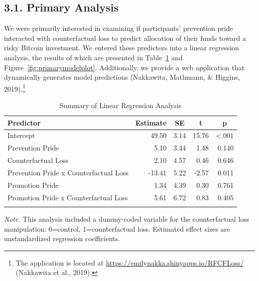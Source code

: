 \documentclass[man,floatsintext]{apa6}
\let\rmarkdownfootnote\footnote%
\def\footnote{\protect\rmarkdownfootnote}
\begin{document}
\hypertarget{primary-analysis}{%
\subsection{3.1. Primary Analysis}\label{primary-analysis}}

We were primarily interested in examining if participants' prevention pride interacted with counterfactual loss to predict allocation of their funds toward a risky Bitcoin investment. We entered these predictors into a linear regression analysis, the results of which are presented in Table~\ref{tab:primarymodelprint} and Figure~\ref{fig:primarymodelplot}. Additionally, we provide a web application that dynamically generates model predictions (Nakkawita, Mathmann, \& Higgins, 2019).\footnote{The application is located at \url{https://emilynakka.shinyapps.io/RFCFLoss/} (Nakkawita et al., 2019).}

\begin{table}[tbp]

\begin{center}
\begin{threeparttable}

\caption{\label{tab:primarymodelprint}Summary of Linear Regression Analysis}

\begin{tabular}{lrrrr}
\toprule
Predictor & \multicolumn{1}{c}{Estimate} & \multicolumn{1}{c}{SE} & \multicolumn{1}{c}{t} & \multicolumn{1}{c}{p}\\
\midrule
Intercept & 49.50 & 3.14 & 15.76 & <.001\\
Prevention Pride & 5.10 & 3.44 & 1.48 & 0.140\\
Counterfactual Loss & 2.10 & 4.57 & 0.46 & 0.646\\
Prevention Pride x Counterfactual Loss & -13.41 & 5.22 & -2.57 & 0.011\\
Promotion Pride & 1.34 & 4.39 & 0.30 & 0.761\\
Promotion Pride x Counterfactual Loss & 5.61 & 6.72 & 0.83 & 0.405\\
\bottomrule
\addlinespace
\end{tabular}

\begin{tablenotes}[para]
\normalsize{\textit{Note.} This analysis included a dummy-coded variable for the counterfactual loss manipulation: 0=control, 1=counterfactual loss. Estimated effect sizes are unstandardized regression coefficients.}
\end{tablenotes}

\end{threeparttable}
\end{center}

\end{table}
\end{document}

